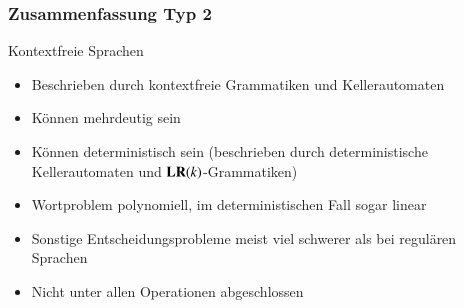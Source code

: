 \documentclass[onlymath]{beamer}
\begin{document}
\maketitle

% 
% 


\begin{frame}\frametitle{Zusammenfassung Typ 2}

Kontextfreie Sprachen
\begin{itemize}
\item Beschrieben durch \alert{kontextfreie Grammatiken} und \alert{Kellerautomaten}
\item Können \alert{mehrdeutig} sein
\item Können \alert{deterministisch} sein (beschrieben durch deterministische Kellerautomaten und $\textbf{\textcolor{black}{LR}}(k)$-Grammatiken)
\item Wortproblem polynomiell, im deterministischen Fall sogar linear
\item Sonstige Entscheidungsprobleme meist viel schwerer als bei regulären Sprachen 
\item Nicht unter allen Operationen abgeschlossen
\end{itemize}

\end{frame}

\end{document}
